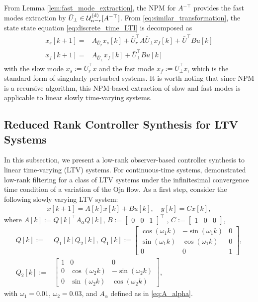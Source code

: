 \documentclass{ifacconf}
\begin{document}
From Lemma \ref{lem:fast_mode_extraction}, the NPM for $A^{-\top}$ provides the fast modes extraction by $\bar{U}_{\perp}  \in \mathcal{U}_{n-r}^{\rm (d)} [A^{-\top}] $. 
From \eqref{eq:similar_transformation}, the state state equation \eqref{eq:discrete_time_LTI} is decomposed as 
\begin{align*}
x_{s} [k+1] =& A_{\bar{U}_{r}} x_{s}[k] + \bar{U}_{r}^{\top} A \bar{U}_{\perp} x_{f}[k] + \bar{U}^{\top}B u[k]
\\
x_{f} [k+1] = & A_{\bar{U}_{\perp}} x_{f}[k] + \bar{U}_{\perp}^{\top}B u[k]
\end{align*}
with the slow mode $x_{s} :=  \bar{U}_{r}^{\top} x$ and the fast mode $x_{f} :=  \bar{U}_{\perp}^{\top} x$, which is the standard form of singularly perturbed systems. 
It is worth noting that since NPM is a recursive algorithm, this NPM-based extraction of slow and fast modes is applicable to linear slowly time-varying systems. 





\subsection{Reduced Rank Controller Synthesis for LTV Systems}

In this subsection, we present a low-rank observer-based controller synthesis to linear time-varying (LTV) systems. 
For continuous-time systems, \cite{tranninger2022detectability} demonstrated low-rank filtering for a class of LTV systems under the infinitesimal convergence time condition of a variation of the Oja flow. 
As a first step, consider the following slowly varying LTV system: 
\begin{align}
    x[k+1] = A[k] x[k] + B u[k],\quad 
    y[k] = C x[k], 
    \label{eq:LTV}
\end{align}
where $A[k] := Q[k]^{\top} A_{\alpha} Q[k]$, $B := \begin{bmatrix} 0 & 0 & 1 \end{bmatrix}^{\top}$
, $C := \begin{bmatrix} 1 & 0 & 0 \end{bmatrix}$,
\begin{align*}
    Q [k] :=& Q_{1}[k]Q_{2}[k], \ 
    Q_{1}[k] :=
    \begin{bmatrix} \cos (\omega_{1}k) & -\sin (\omega_{1}k) & 0
    \\
    \sin (\omega_{1}k) & \cos(\omega_{1}k) & 0 \\ 0& 0 & 1 
    \end{bmatrix},
    \\
    Q_{2}[k]:= &
    \begin{bmatrix}1 & 0 & 0 
    \\ 0 & \cos (\omega_{2}k) & -\sin (\omega_{2}k) 
    \\
    0 & \sin (\omega_{2}k) & \cos(\omega_{2}k)  \end{bmatrix},
\end{align*}
with $\omega _{1}=0.01$, $\omega_{2}=0.03$, and $A_{\alpha}$ defined as in \eqref{eq:A_alpha}. 
\end{document}
